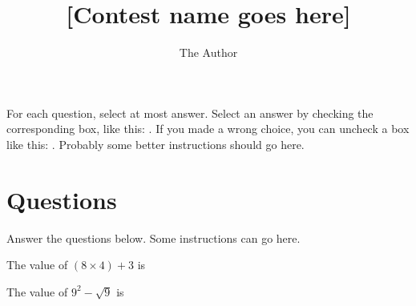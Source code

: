 \documentclass[
  english,
  ]{sdapsclassic}
\author{The Author}
\title{[Contest name goes here]}
\begin{document}

  \begin{questionnaire}[noinfo]
  \begin{Form}
    \begin{info}
      For each question, select at most answer. Select an answer by checking
      the corresponding box, like this: \checkedbox{}. If you made a wrong
      choice, you can uncheck a box like this: \correctedbox{}.
      Probably some better instructions should go here.
    \end{info}


    \section{Questions}
    \begin{info}
      Answer the questions below. Some instructions can go here.
    \end{info}

    \begin{choicequestion}[cols=5,singlechoice]{The value of $(8 \times 4)+3$ is}
    \end{choicequestion}

    \begin{choicequestion}[cols=5,singlechoice]{The value of $9^2 - \sqrt{9}$ is}
    \end{choicequestion}


\end{Form}
\end{questionnaire}
\end{document}
